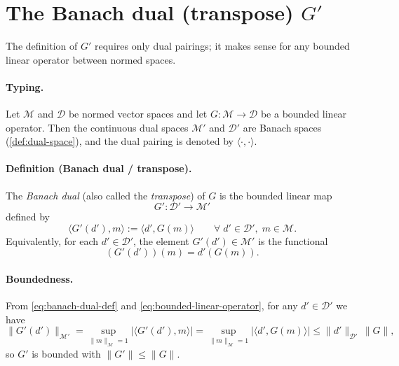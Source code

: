 \documentclass[11pt,twoside,openright]{book}
\theoremstyle{plain}
\theoremstyle{definition}
\theoremstyle{remark}
\newcommand{\modelspace}{\mathcal{M}}
\newcommand{\dataspace}{\mathcal{D}}
\newcommand{\pair}[2]{\langle #1, #2\rangle}
\begin{document}
\section{The Banach dual (transpose) $G'$}
\label{sec:banach-dual}

The definition of $G'$ requires only dual pairings; it makes sense for any
bounded linear operator between normed spaces.

\paragraph{Typing.}
Let $\modelspace$ and $\dataspace$ be normed vector spaces and let
$G : \modelspace \to \dataspace$ be a bounded linear operator.
Then the continuous dual spaces $\modelspace'$ and $\dataspace'$ are Banach
spaces (\cref{def:dual-space}), and the dual pairing is denoted by
$\pair{\cdot}{\cdot}$.

\paragraph{Definition (Banach dual / transpose).}
The \emph{Banach dual} (also called the \emph{transpose}) of $G$ is the bounded
linear map
\begin{equation}
  \label{eq:banach-dual-typing}
  G' : \dataspace' \to \modelspace'
\end{equation}
defined by
\begin{equation}
  \label{eq:banach-dual-def}
  \pair{G'(d')}{m} := \pair{d'}{G(m)}
  \qquad \forall\; d'\in\dataspace',\; m\in\modelspace.
\end{equation}
Equivalently, for each $d'\in\dataspace'$, the element $G'(d')\in\modelspace'$
is the functional
\begin{equation}
  (G'(d'))(m) = d'(G(m)).
\end{equation}

\paragraph{Boundedness.}
From \eqref{eq:banach-dual-def} and \eqref{eq:bounded-linear-operator}, for any
$d'\in\dataspace'$ we have
\begin{equation}
  \|G'(d')\|_{\modelspace'}
  = \sup_{\|m\|_{\modelspace}=1} \bigl|\pair{G'(d')}{m}\bigr|
  = \sup_{\|m\|_{\modelspace}=1} \bigl|\pair{d'}{G(m)}\bigr|
  \le \|d'\|_{\dataspace'}\,\|G\|,
\end{equation}
so $G'$ is bounded with $\|G'\|\le\|G\|$.
\end{document}
